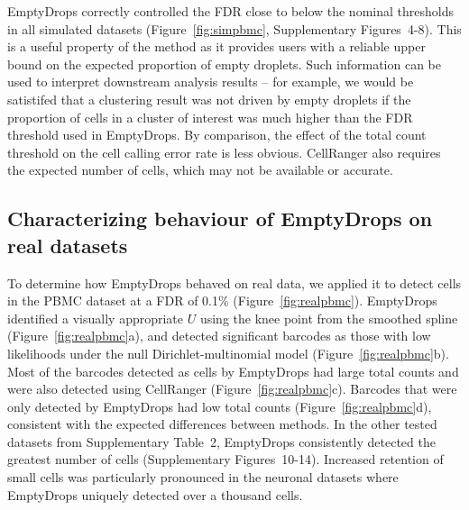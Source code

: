 \documentclass[10pt,letterpaper]{article}
\newcommand{\supptabdataset}{2}
\newcommand{\suppfigsimresults}{4-8}
\newcommand{\suppfigrealresults}{10-14}
\begin{document}
EmptyDrops correctly controlled the FDR close to below the nominal thresholds in all simulated datasets (Figure~\ref{fig:simpbmc}, Supplementary Figures~\suppfigsimresults{}).
This is a useful property of the method as it provides users with a reliable upper bound on the expected proportion of empty droplets.
Such information can be used to interpret downstream analysis results --
for example, we would be satistifed that a clustering result was not driven by empty droplets if the proportion of cells in a cluster of interest was much higher than the FDR threshold used in EmptyDrops.
By comparison, the effect of the total count threshold on the cell calling error rate is less obvious.
CellRanger also requires the expected number of cells, which may not be available or accurate.

\subsection*{Characterizing behaviour of EmptyDrops on real datasets}
To determine how EmptyDrops behaved on real data, we applied it to detect cells in the PBMC dataset at a FDR of 0.1\% (Figure~\ref{fig:realpbmc}).
EmptyDrops identified a visually appropriate $U$ using the knee point from the smoothed spline (Figure~\ref{fig:realpbmc}a),
and detected significant barcodes as those with low likelihoods under the null Dirichlet-multinomial model (Figure~\ref{fig:realpbmc}b).
Most of the barcodes detected as cells by EmptyDrops had large total counts and were also detected using CellRanger (Figure~\ref{fig:realpbmc}c). 
Barcodes that were only detected by EmptyDrops had low total counts (Figure~\ref{fig:realpbmc}d), consistent with the expected differences between methods.
In the other tested datasets from Supplementary Table~\supptabdataset{}, EmptyDrops consistently detected the greatest number of cells (Supplementary Figures~\suppfigrealresults{}).
Increased retention of small cells was particularly pronounced in the neuronal datasets where EmptyDrops uniquely detected over a thousand cells.
\end{document}
